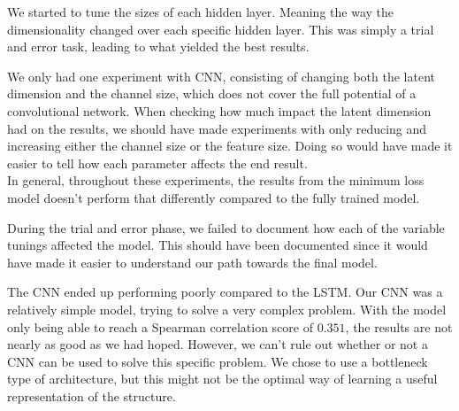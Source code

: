 \noindent
We started to tune the sizes of each hidden layer. Meaning the way the dimensionality changed over each specific hidden layer. This was simply a trial and error task, leading to what yielded the best results.

\noindent
We only had one experiment with CNN, consisting of changing both the latent dimension and the channel size, which does not cover the full potential of a convolutional network. When checking how much impact the latent dimension had on the results, we should have made experiments with only reducing and increasing either the channel size or the feature size. Doing so would have made it easier to tell how each parameter affects the end result. \\

\noindent
In general, throughout these experiments, the results from the minimum loss model doesn't perform that differently compared to the fully trained model.

\noindent
During the trial and error phase, we failed to document how each of the variable tunings affected the model. This should have been documented since it would have made it easier to understand our path towards the final model.

\noindent
The CNN ended up performing poorly compared to the LSTM. Our CNN was a relatively simple model, trying to solve a very complex problem. With the model only being able to reach a Spearman correlation score of $0.351$, the results are not nearly as good as we had hoped. However, we can't rule out whether or not a CNN can be used to solve this specific problem. We chose to use a bottleneck type of architecture, but this might not be the optimal way of learning a useful representation of the structure.
